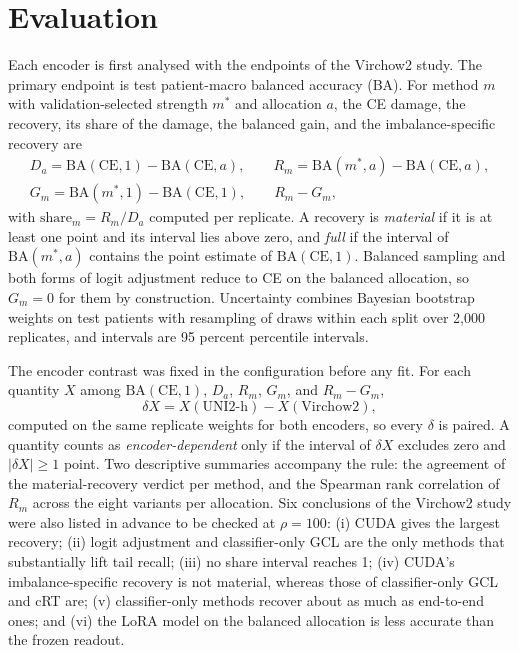 \documentclass[11pt]{article}
\begin{document}
\section{Evaluation}
\label{sec:evaluation}
Each encoder is first analysed with the endpoints of the Virchow2 study. The primary endpoint is test patient-macro balanced accuracy (BA). For method $m$ with validation-selected strength $m^{*}$ and allocation $a$, the CE damage, the recovery, its share of the damage, the balanced gain, and the imbalance-specific recovery are
\begin{equation}
  \begin{gathered}
  D_a=\mathrm{BA}(\mathrm{CE},1)-\mathrm{BA}(\mathrm{CE},a),\qquad
  R_m=\mathrm{BA}(m^{*},a)-\mathrm{BA}(\mathrm{CE},a),\\
  G_m=\mathrm{BA}(m^{*},1)-\mathrm{BA}(\mathrm{CE},1),\qquad
  R_m-G_m ,
  \end{gathered}
  \label{eq:endpoints}
\end{equation}
\noindent with $\text{share}_m=R_m/D_a$ computed per replicate. A recovery is \emph{material} if it is at least one point and its interval lies above zero, and \emph{full} if the interval of $\mathrm{BA}(m^{*},a)$ contains the point estimate of $\mathrm{BA}(\mathrm{CE},1)$. Balanced sampling and both forms of logit adjustment reduce to CE on the balanced allocation, so $G_m=0$ for them by construction. Uncertainty combines Bayesian bootstrap weights on test patients \citep{rubin1981bayesian} with resampling of draws within each split over 2,000 replicates, and intervals are 95 percent percentile intervals.

The encoder contrast was fixed in the configuration before any fit. For each quantity $X$ among $\mathrm{BA}(\mathrm{CE},1)$, $D_a$, $R_m$, $G_m$, and $R_m-G_m$,
\begin{equation}
  \delta X = X(\text{UNI2-h})-X(\text{Virchow2}),
  \label{eq:delta}
\end{equation}
\noindent computed on the same replicate weights for both encoders, so every $\delta$ is paired. A quantity counts as \emph{encoder-dependent} only if the interval of $\delta X$ excludes zero and $|\delta X|\geq1$ point. Two descriptive summaries accompany the rule: the agreement of the material-recovery verdict per method, and the Spearman rank correlation of $R_m$ across the eight variants per allocation. Six conclusions of the Virchow2 study were also listed in advance to be checked at $\rho=100$: (i) CUDA gives the largest recovery; (ii) logit adjustment and classifier-only GCL are the only methods that substantially lift tail recall; (iii) no share interval reaches 1; (iv) CUDA's imbalance-specific recovery is not material, whereas those of classifier-only GCL and cRT are; (v) classifier-only methods recover about as much as end-to-end ones; and (vi) the LoRA model on the balanced allocation is less accurate than the frozen readout.
\end{document}
